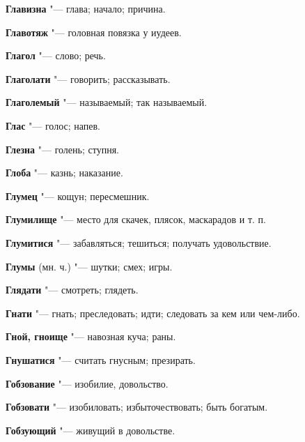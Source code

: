 \begin{mymulticols}{2}
\noindent\textbf{Главизна} "--- глава; начало; причина. 




\noindent\textbf{Главотяж} "--- головная повязка у иудеев. 




\noindent\textbf{Глагол} "--- слово; речь. 




\noindent\textbf{Глаголати} "--- говорить; рассказывать. 




\noindent\textbf{Глаголемый} "--- называемый; так называемый. 




\noindent\textbf{Глас} "--- голос; напев. 




\noindent\textbf{Глезна} "--- голень; ступня. 




\noindent\textbf{Глоба} "--- казнь; наказание. 




\noindent\textbf{Глумец} "--- кощун; пересмешник. 




\noindent\textbf{Глумилище} "--- место для скачек, плясок, маскарадов и т. п. 




\noindent\textbf{Глумитися} "--- забавляться; тешиться; получать удовольствие. 




\noindent\textbf{Глумы} (мн. ч.) "--- шутки; смех; игры. 




\noindent\textbf{Глядати} "--- смотреть; глядеть. 




\noindent\textbf{Гнати} "--- гнать; преследовать; идти; следовать за кем или чем-либо. 




\noindent\textbf{Гной, гноище} "--- навозная куча; раны. 




\noindent\textbf{Гнушатися} "--- считать гнусным; презирать. 




\noindent\textbf{Гобзование} "--- изобилие, довольство. 




\noindent\textbf{Гобзовати} "--- изобиловать; избыточествовать; быть богатым. 




\noindent\textbf{Гобзующий} "--- живущий в довольстве. 





\end{mymulticols}
